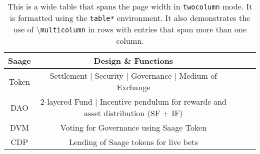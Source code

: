 \documentclass[%
 reprint,
 amsmath,amssymb,
 aps,
]{revtex4-2}
\begin{document}
\begin{table*}
\caption{\label{tab:table3}This is a wide table that spans the page
width in \texttt{twocolumn} mode. It is formatted using the
\texttt{table*} environment. It also demonstrates the use of
\textbackslash\texttt{multicolumn} in rows with entries that span
more than one column.}
\begin{ruledtabular}
\begin{tabular}{ccccc}
Saage & Design \& Functions \\
\hline
 Token & Settlement | Security | Governance | Medium of Exchange\\
 DAO & 2-layered Fund | Incentive pendulum for rewards and asset distribution (SF + IF)\\
 DVM & Voting for Governance using Saage Token\\
CDP & Lending of Saage tokens for live bets
\hline




\end{tabular}
\end{ruledtabular}
\end{table*}

%
\end{document}
